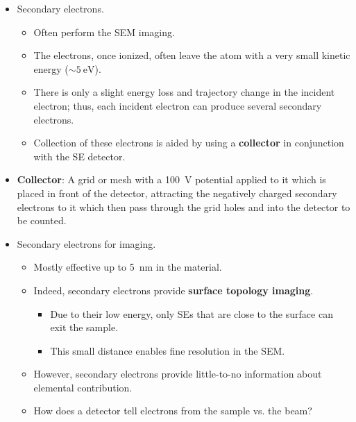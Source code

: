 \documentclass[../notes.tex]{subfiles}
\begin{document}
\begin{itemize}
\begin{itemize}
\begin{itemize}
            \item Augers: Only \SIrange{10}{30}{\angstrom}.
            \item Secondaries: Up to \SI{100}{\angstrom}.
            \item Backscattered: $<\SIrange{1}{2}{\micro\meter}$.
            \item Range of electron penetration: About \SI{5}{\micro\meter} in total.
        \end{itemize}
    \end{itemize}
    \item Secondary electrons.
    \begin{itemize}
        \item Often perform the SEM imaging.
        \item The electrons, once ionized, often leave the atom with a very small kinetic energy ($\sim\SI{5}{\electronvolt}$).
        \item There is only a slight energy loss and trajectory change in the incident electron; thus, each incident electron can produce several secondary electrons.
        \item Collection of these electrons is aided by using a \textbf{collector} in conjunction with the SE detector.
    \end{itemize}
    \item \textbf{Collector}: A grid or mesh with a \SI{+100}{\volt} potential applied to it which is placed in front of the detector, attracting the negatively charged secondary electrons to it which then pass through the grid holes and into the detector to be counted.
    \item Secondary electrons for imaging.
    \begin{itemize}
        \item Mostly effective up to \SI{5}{\nano\meter} in the material.
        \item Indeed, secondary electrons provide \textbf{surface topology imaging}.
        \begin{itemize}
            \item Due to their low energy, only SEs that are close to the surface can exit the sample.
            \item This small distance enables fine resolution in the SEM.
        \end{itemize}
        \item However, secondary electrons provide little-to-no information about elemental contribution.
        \item How does a detector tell electrons from the sample vs. the beam?

\end{itemize}
\end{itemize}
\end{document}
